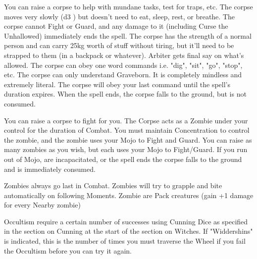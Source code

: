 {\NECRO[
  Name=Zombie Slave,
  Link=necromancy-zombie-slave,
  Paradigm=Death,
  Save=N,
  Duration=Session,
  Mod=+9,
  Keywords=None,
  Target=Close (touch) corpse
]


You can raise a corpse to help with mundane tasks, test for traps, etc.  The corpse moves very slowly (d3 \MD) but doesn't need to eat, sleep, rest, or breathe.  The corpse cannot Fight or Guard, and any damage to it (including Curse the Unhallowed) immediately ends the spell.  The corpse has the strength of a normal person and can carry 25kg worth of stuff without tiring, but it'll need to be strapped to them (in a backpack or whatever).  Arbiter gets final say on what's allowed. The corpse can obey one word commands i.e. "dig", "sit", "go", "stop", etc.  The corpse can only understand Graveborn. It is completely mindless and extremely literal. The corpse will obey your last command until the spell's duration expires.  When the spell ends, the corpse falls to the ground, but is not consumed.

\NECRO[
  Name=Zombie Warrior,
  Link=necromancy-zombie-warrior,
  Paradigm=Death,
  Save=N,
  Duration=Combat,
  Mod=+6,
  Keywords=Conc.,
  Target=Close (touch) corpse
]

You can raise a corpse to fight for you. The Corpse acts as a Zombie under your control for the duration of Combat.  You must maintain Concentration to control the zombie, and the zombie uses your Mojo to Fight and Guard.  You can raise as many zombies as you wish, but each uses your Mojo to Fight/Guard.  If you run out of Mojo, are incapacitated, or the spell ends the corpse falls to the ground and is immediately consumed.

\cbreak

\MONSTERBLOCK[
  Name=Zombie,
  Link=monster-zombie,
  MV=Slow*,
  WK=d20,
  DMG=2d4 1 Close,
  HD=2,
  Power=Strong,
  Soak=0,
  Morale=n/a,
  Save=2,
  Extras={Pack}
]

Zombies always go last in Combat. Zombies will try to grapple and bite automatically on following Moments. Zombie are Pack creatures (gain +1 damage for every Nearby zombie)


\newpage


Occultism require a certain number of successes using Cunning Dice as specified in the section on Cunning at the start of the section on Witches.  If "Widdershins" is indicated, this is the number of times you must traverse the Wheel if you fail the Occultism before you can try it again.

}
